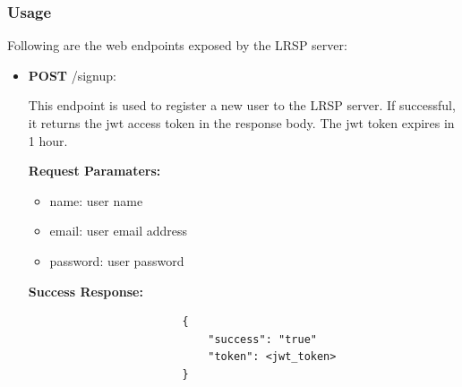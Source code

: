 \documentclass{article}
\begin{document}
        \subsubsection{Usage}
        Following are the web endpoints exposed by the LRSP server:
        \begin{itemize}
            \item \textbf{POST} /signup:
                \begin{addmargin}[1em]{2em}%
                    This endpoint is used to register a new user to the LRSP server. If successful, it returns the jwt access token in the response body. The jwt token expires in 1 hour.
                    \par\textbf{Request Paramaters:}
                    \begin{itemize}
                        \item name: user name
                        \item email: user email address
                        \item password: user password
                    \end{itemize}
                    \par\textbf{Success Response:}
                    \begin{listing}[H]
                    \begin{verbatim}
                        {     
                            "success": "true"
                            "token": <jwt_token>
                        }
                    \end{verbatim}
                    \end{listing}
                \end{addmargin}
                

\end{itemize}
\end{document}
